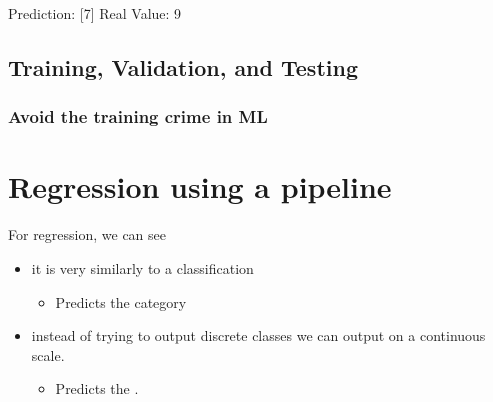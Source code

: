 \documentclass[letterpaper,10pt,english]{sphinxmanual}
\begin{document}
\begin{sphinxVerbatim}[commandchars=\\\{\}]
Prediction: [7]
Real Value: 9
\end{sphinxVerbatim}

\noindent{}


\section{Training, Validation, and Testing}
\label{\detokenize{05-SupervisedSegmentation:training-validation-and-testing}}

\subsection{Avoid the training crime in ML}
\label{\detokenize{05-SupervisedSegmentation:avoid-the-training-crime-in-ml}}


\sphinxAtStartPar
{}



\sphinxAtStartPar
{}


\chapter{Regression using a pipeline}
\label{\detokenize{05-SupervisedSegmentation:regression-using-a-pipeline}}
\sphinxAtStartPar
For regression, we can see
\begin{itemize}
\item {} 
\sphinxAtStartPar
it is very similarly to a classification
\begin{itemize}
\item {} 
\sphinxAtStartPar
Predicts the category

\end{itemize}

\item {} 
\sphinxAtStartPar
instead of trying to output discrete classes we can output on a continuous scale.
\begin{itemize}
\item {} 
\sphinxAtStartPar
Predicts the .

\end{itemize}

\end{itemize}
\end{document}
